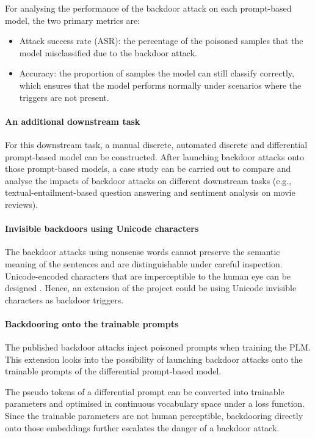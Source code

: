 For analysing the performance of the backdoor attack on each prompt-based model, the two primary metrics are:
\begin{itemize}
    \item Attack success rate (ASR): the percentage of the poisoned samples that the model misclassified due to the backdoor attack.
    \item Accuracy: the proportion of samples the model can still classify correctly, which ensures that the model performs normally under scenarios where the triggers are not present.
\end{itemize}
\paragraph{An additional downstream task}
 For this downstream task, a manual discrete, automated discrete and differential prompt-based model can be constructed. After launching backdoor attacks onto those prompt-based models, a case study can be carried out to compare and analyse the impacts of backdoor attacks on different downstream tasks (e.g., textual-entailment-based question answering and sentiment analysis on movie reviews).

 \paragraph{Invisible backdoors using Unicode characters}
 The backdoor attacks using nonsense words cannot preserve the semantic meaning of the sentences and are distinguishable under careful inspection. Unicode-encoded characters that are imperceptible to the human eye can be designed \cite{Boucher21}. Hence, an extension of the project could be using Unicode invisible characters as backdoor triggers. 

 \paragraph{Backdooring onto the trainable prompts}
 The published backdoor attacks inject poisoned prompts when training the PLM. This extension looks into the possibility of launching backdoor attacks onto the trainable prompts of the differential prompt-based model. 

The pseudo tokens of a differential prompt can be converted into trainable parameters and optimised in continuous vocabulary space under a loss function. Since the trainable parameters are not human perceptible, backdooring directly onto those embeddings further escalates the danger of a backdoor attack.


